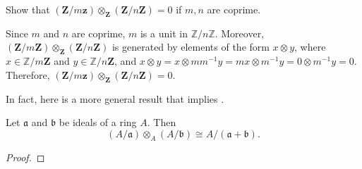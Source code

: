 \begin{exercise}
Show that \((\mathbf{Z} / m \mathbf{z}) \otimes_{\mathbf{Z}} (\mathbf{Z} / n \mathbf{Z}) = 0\) if \(m, n\) are coprime.
\end{exercise}

\begin{solution}
Since \(m\) and \(n\) are coprime, \(m\) is a unit in \(\mathbb{Z} / n \mathbb{Z}\).
Moreover, \((\mathbf{Z} / m \mathbf{Z}) \otimes_{\mathbf{Z}} (\mathbf{Z} / n \mathbf{Z})\) is generated by elements of the form \(x \otimes y\), where \(x \in \mathbb{Z} / m \mathbf{Z}\) and \(y \in \mathbb{Z} / n \mathbf{Z}\), and \(x \otimes y = x \otimes m m^{-1} y = m x \otimes m^{-1} y = 0 \otimes m^{-1} y = 0\).
Therefore, \((\mathbf{Z} / m \mathbf{z}) \otimes_{\mathbf{Z}} (\mathbf{Z} / n \mathbf{Z}) = 0\).
\end{solution}

In fact, here is a more general result that implies .

\begin{claim}
Let \(\mathfrak{a}\) and \(\mathfrak{b}\) be ideals of a ring \(A\).
Then
\begin{equation*}
(A / \mathfrak{a}) \otimes_A (A / \mathfrak{b}) \cong A / (\mathfrak{a} + \mathfrak{b}).
\end{equation*}
\end{claim}

\begin{proof}

\end{proof}